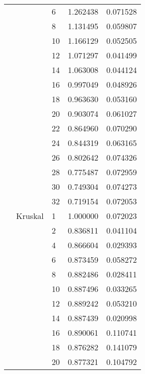 \begin{tabular}{lllrr}
                      &            & 6  &  1.262438 &  0.071528 \\
                      &            & 8  &  1.131495 &  0.059807 \\
                      &            & 10 &  1.166129 &  0.052505 \\
                      &            & 12 &  1.071297 &  0.041499 \\
                      &            & 14 &  1.063008 &  0.044124 \\
                      &            & 16 &  0.997049 &  0.048926 \\
                      &            & 18 &  0.963630 &  0.053160 \\
                      &            & 20 &  0.903074 &  0.061027 \\
                      &            & 22 &  0.864960 &  0.070290 \\
                      &            & 24 &  0.844319 &  0.063165 \\
                      &            & 26 &  0.802642 &  0.074326 \\
                      &            & 28 &  0.775487 &  0.072959 \\
                      &            & 30 &  0.749304 &  0.074273 \\
                      &            & 32 &  0.719154 &  0.072053 \\
                      & Kruskal & 1  &  1.000000 &  0.072023 \\
                      &            & 2  &  0.836811 &  0.041104 \\
                      &            & 4  &  0.866604 &  0.029393 \\
                      &            & 6  &  0.873459 &  0.058272 \\
                      &            & 8  &  0.882486 &  0.028411 \\
                      &            & 10 &  0.887496 &  0.033265 \\
                      &            & 12 &  0.889242 &  0.053210 \\
                      &            & 14 &  0.887439 &  0.020998 \\
                      &            & 16 &  0.890061 &  0.110741 \\
                      &            & 18 &  0.876282 &  0.141079 \\
                      &            & 20 &  0.877321 &  0.104792 \\

\end{tabular}
